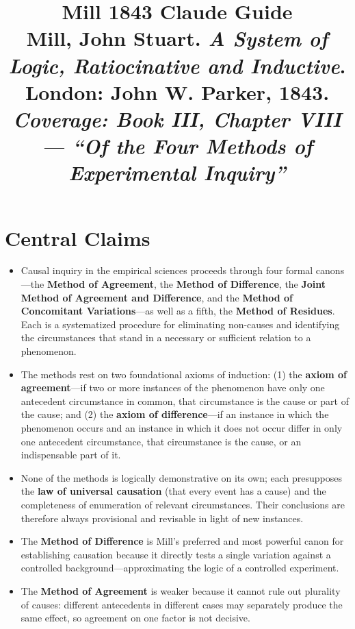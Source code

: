 \documentclass[12pt]{article}
\title{\textbf{Mill 1843 Claude Guide}\\
\large Mill, John Stuart. \textit{A System of Logic, Ratiocinative and Inductive}.\\
London: John W. Parker, 1843.\\[0.5em]
\normalsize \textit{Coverage: Book III, Chapter VIII --- ``Of the Four Methods of Experimental Inquiry''}}
\author{}
\date{}
\begin{document}
\maketitle
\tableofcontents
\newpage

\section{Central Claims}

\begin{itemize}[leftmargin=*, itemsep=4pt]
    \item Causal inquiry in the empirical sciences proceeds through four formal canons---the \textbf{Method of Agreement}, the \textbf{Method of Difference}, the \textbf{Joint Method of Agreement and Difference}, and the \textbf{Method of Concomitant Variations}---as well as a fifth, the \textbf{Method of Residues}. Each is a systematized procedure for eliminating non-causes and identifying the circumstances that stand in a necessary or sufficient relation to a phenomenon.
    \item The methods rest on two foundational axioms of induction: (1) the \textbf{axiom of agreement}---if two or more instances of the phenomenon have only one antecedent circumstance in common, that circumstance is the cause or part of the cause; and (2) the \textbf{axiom of difference}---if an instance in which the phenomenon occurs and an instance in which it does not occur differ in only one antecedent circumstance, that circumstance is the cause, or an indispensable part of it.
    \item None of the methods is logically demonstrative on its own; each presupposes the \textbf{law of universal causation} (that every event has a cause) and the completeness of enumeration of relevant circumstances. Their conclusions are therefore always provisional and revisable in light of new instances.
    \item The \textbf{Method of Difference} is Mill's preferred and most powerful canon for establishing causation because it directly tests a single variation against a controlled background---approximating the logic of a controlled experiment.
    \item The \textbf{Method of Agreement} is weaker because it cannot rule out plurality of causes: different antecedents in different cases may separately produce the same effect, so agreement on one factor is not decisive.

\end{itemize}
\end{document}
